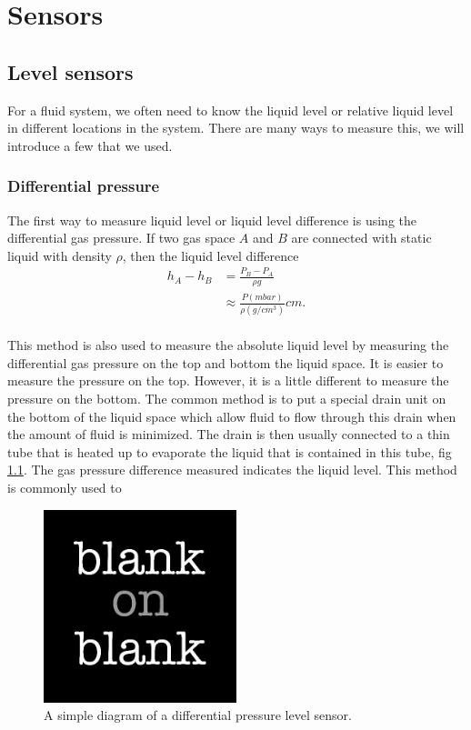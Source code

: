 
\chapter{Sensors}
\section{Level sensors}
For a fluid system, we often need to know the liquid level or relative liquid level in different locations in the system. There are many ways to measure this, we will introduce a few that we used.\\
\subsection{Differential pressure}
The first way to measure liquid level or liquid level difference is using the differential gas pressure. If two gas space $A$ and $B$ are connected with static liquid with density $\rho$, then the liquid level difference 
\begin{align}
h_{A}-h_{B} & = \frac{P_{B}-P_{A}}{\rho g} \\
& \approx \frac{P (mbar)}{\rho (g/cm^3)} cm.
\end{align}
\\
This method is also used to measure the absolute liquid level by measuring the differential gas pressure on the top and bottom the liquid space. It is easier to measure the pressure on the top. However, it is a little different to measure the pressure on the bottom. The common method is to put a special drain unit on the bottom of the liquid space which allow fluid to flow through this drain when the amount of fluid is minimized. The drain is then usually connected to a thin tube that is heated up to evaporate the liquid that is contained in this tube, fig \ref{fig: level}. The gas pressure difference measured indicates the liquid level. This method is commonly used to \\



\begin{figure}[h!]
  \centering
  \includegraphics[width=0.5\textwidth]
  {blank.jpg}
  \caption{A simple diagram of a differential pressure level sensor.}
  \label{fig: level}
\end{figure}


